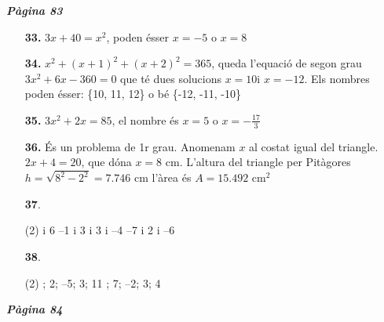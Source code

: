 \documentclass[a4paper, pdf, twoside]{book}
\begin{document}
\begin{multicols}{2}

{\textbf{\em Pàgina 83}} \hrulefill
\begin{enumerate}
\vspace{0.25cm}
\item[\fontfamily{phv}\selectfont\color{blue}\textbf{33. }] 
$3x+40=x^2$, poden ésser $x=-5$ o $x=8$
 \end{enumerate}
\begin{enumerate}
\vspace{0.25cm}
\item[\fontfamily{phv}\selectfont\color{blue}\textbf{34. }] 
$x^2+(x+1)^2+(x+2)^2=365$, queda l'equació de segon grau $3x^2+6x-360=0$ que té dues solucions $x=10$i $x=-12$. Els nombres poden ésser: \{10, 11, 12\} o bé \{-12, -11, -10\} 
\vspace{0.25cm}
\item[\fontfamily{phv}\selectfont\color{blue}\textbf{35. }] 
$3x^2+2x=85$, el nombre és $x=5$ o $x=-\frac {17}{3}$
\vspace{0.25cm}
\item[\fontfamily{phv}\selectfont\color{blue}\textbf{36. }] 
És un problema de 1r grau. Anomenam $x$ al costat igual del triangle. $2x+4=20$, que dóna $x=8$ cm. L'altura del triangle per Pitàgores $h=\sqrt {8^2-2^2}=7.746$ cm l'àrea és $A=15.492$ cm$^2$
\vspace{0.25cm}



 \item[\fontfamily{phv}\selectfont\color{blue}\textbf{37}. ] 
 \begin{tasks}[column-sep=1em, item-indent=1.3333em](2)
	  i 6
	 \task --1 i 3
	  i 3
	  i --4
	 \task --7 i 2
	  i --6
\end{tasks}
\vspace{0.25cm}



 \item[\fontfamily{phv}\selectfont\color{blue}\textbf{38}. ] 
 \begin{tasks}[column-sep=1em, item-indent=1.3333em](2)
	 ; 2; --5; 3; 11
	 ; 7; --2; 3; 4
\end{tasks}
 \end{enumerate}
\vspace{0.3cm}


{\textbf{\em Pàgina 84}} \hrulefill
\begin{enumerate}
\vspace{0.25cm}



\end{enumerate}
\end{multicols}
\end{document}
